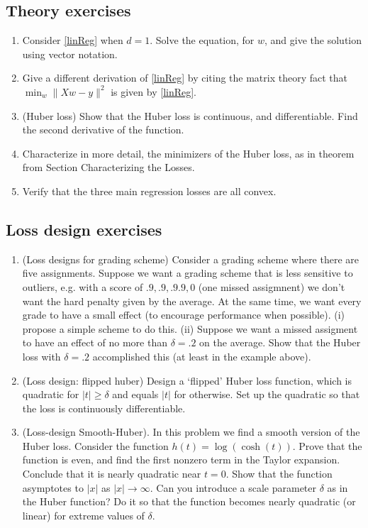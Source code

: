 \documentclass[12pt]{amsart}
\begin{document}
\subsection{Theory exercises}

\begin{enumerate}
	\item Consider \eqref{linReg} when $d=1$.  Solve the equation, for $w$, and give the solution using vector notation. 
	\item Give a different derivation of \eqref{linReg} by citing the matrix theory fact that $\min_w \|Xw-y\|^2$ is given by \eqref{linReg}. 
	\item (Huber loss)  Show that the Huber loss is continuous, and differentiable.  Find the second derivative of the function.
	\item  Characterize in more detail, the minimizers of the Huber loss, as in theorem from Section Characterizing the Losses.  
	\item Verify that the three main regression losses are all convex. 

\end{enumerate}

\subsection{Loss design exercises}
\begin{enumerate}
		\item (Loss designs for grading scheme) Consider a grading scheme where there are five assignments.   Suppose we want a grading scheme that is less sensitive to outliers, e.g. with a score of $.9, .9, .9 .9, 0$ (one missed assigmnent) we don't want the hard penalty given by the average.  At the same time, we want every grade to have a small effect (to encourage performance when possible).  (i) propose a simple scheme to do this.  (ii) Suppose we want a missed assigment to have an effect of no more than $\delta = .2$ on the average.  Show that the Huber loss with $\delta = .2$ accomplished this (at least in the example above). 
	\item (Loss design: flipped huber) Design a `flipped' Huber loss function, which is quadratic for $|t| \geq \delta$ and equals $|t|$ for otherwise.  Set up the quadratic so that the loss is continuously differentiable. 	
	\item (Loss-design Smooth-Huber). In this problem we find a smooth version of the Huber loss. Consider the function  $h(t) = \log(\cosh(t))$.     Prove that the function is even, and find the first nonzero term in the Taylor expansion.  Conclude that it is nearly quadratic near $t=0$.  Show that the function asymptotes to $|x|$ as $|x| \to \infty$.   Can you introduce a scale parameter $\delta$ as in the Huber function?  Do it so that the function becomes nearly quadratic (or linear) for extreme values of $\delta$. 

\end{enumerate}

%
\end{document}
